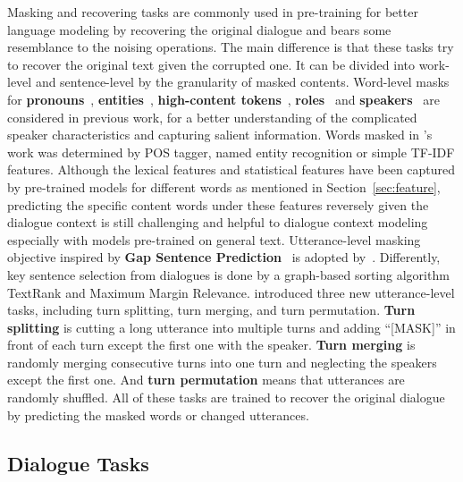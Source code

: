 Masking and recovering tasks 
are commonly used in pre-training for better language modeling by recovering the original dialogue and 
bears some resemblance to the noising operations. The main difference is that these tasks try to recover the original text given the corrupted one.
 It can be divided into 
work-level and sentence-level by the granularity of masked contents.
Word-level masks for \textbf{pronouns}~\cite{khalifa2021bag}, \textbf{entities}~\cite{liu2022entity,khalifa2021bag}, 
\textbf{high-content tokens}~\cite{khalifa2021bag}, 
\textbf{roles}~\cite{qi2021improving} and \textbf{speakers}~\cite{zhong2021dialoglm} are 
considered in previous work, for a better understanding of the complicated speaker 
characteristics and capturing salient information. Words masked 
in \citet{khalifa2021bag}'s work was determined by POS tagger, 
named entity recognition or simple TF-IDF features. Although the lexical 
features and statistical features have been captured by pre-trained models 
for different words as mentioned in Section~\ref{sec:feature}, predicting 
the specific content words under these features reversely given the dialogue context is still challenging and helpful to dialogue context modeling especially with models pre-trained on general text.
Utterance-level masking objective inspired by \textbf{Gap Sentence Prediction}~\cite{zhang2020pegasus} is adopted by~\citet{qi2021improving}. Differently, key sentence selection from dialogues is done by a graph-based sorting algorithm TextRank and Maximum Margin Relevance. 
\citet{zhong2021dialoglm} introduced three new utterance-level tasks, 
including turn splitting, turn merging, and turn permutation. 
\textbf{Turn splitting} is cutting a long utterance into multiple turns and 
adding ``[MASK]'' in front of each turn except the first one with 
the speaker. \textbf{Turn merging} is randomly merging consecutive turns 
into one turn and neglecting the speakers except the first one. 
And \textbf{turn permutation} means that utterances are randomly shuffled.
All of these tasks are trained to recover the original dialogue by predicting the masked words or changed utterances.

\subsection{Dialogue Tasks} 

